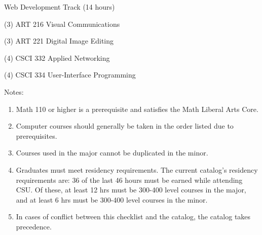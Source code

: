 \begin{reqgroup}{Web Development Track (14 hours)}
\begin{checklist}
	\item (3) ART 216 Visual Communications
	\item (3) ART 221 Digital Image Editing
	\item (4) CSCI 332 Applied Networking
	\item (4) CSCI 334 User-Interface Programming
\end{checklist}
\end{reqgroup}

Notes:%
\begin{enumerate}\footnotesize
	\item Math 110 or higher is a prerequisite and satisfies the Math Liberal Arts Core.
	\item Computer courses should generally be taken in the order listed due to prerequisites.
	\item Courses used in the major cannot be duplicated in the minor.
	\item Graduates must meet residency requirements. The current catalog’s residency requirements are: 36 of the last 46 hours must be earned while attending CSU. Of these, at least 12 hrs must be 300-400 level courses in the major, and at least 6 hrs must be 300-400 level courses in the minor.
	\item In cases of conflict between this checklist and the catalog, the catalog takes precedence.
\end{enumerate}